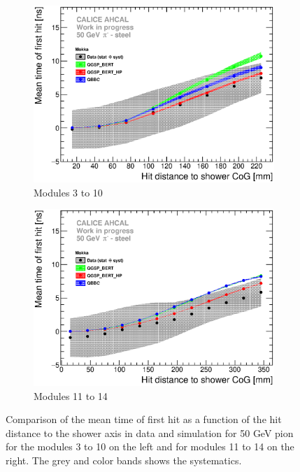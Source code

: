 \begin{figure}[htbp!]
	\begin{subfigure}[t]{0.49\textwidth}
		\centering
		\includegraphics[width=1\textwidth]{../Thesis_Plots/Timing/Pions/Plots/ComparisonToSim/Time_Radius_50GeV_SSF_Mokka.eps}
		\caption{Modules 3 to 10} \label{fig:Radius_SSF_SimData_50GeV}
	\end{subfigure}
	\hfill
	\begin{subfigure}[t]{0.49\textwidth}
		\centering
		\includegraphics[width=1\textwidth]{../Thesis_Plots/Timing/Pions/Plots/ComparisonToSim/Time_Radius_50GeV_BL_Mokka.eps}
		\caption{Modules 11 to 14} \label{fig:Radius_BL_SimData_50GeV}
	\end{subfigure}
	\caption{Comparison of the mean time of first hit as a function of the hit distance to the shower axis in data and \mokka simulation for 50 GeV pion for the modules 3 to 10 on the left and for modules 11 to 14 on the right. The grey and color bands shows the systematics.}
	\label{fig:Radius_SSF_SimData_50GeVComparison}
\end{figure}

